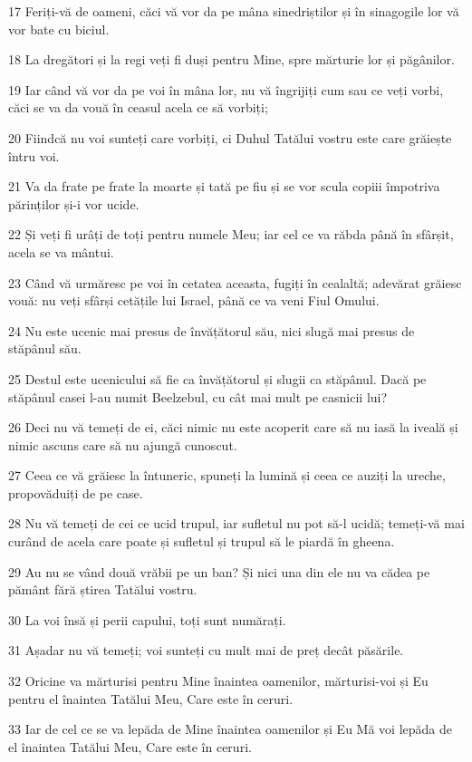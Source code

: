 \par 17 Feriți-vă de oameni, căci vă vor da pe mâna sinedriștilor și în sinagogile lor vă vor bate cu biciul.
\par 18 La dregători și la regi veți fi duși pentru Mine, spre mărturie lor și păgânilor.
\par 19 Iar când vă vor da pe voi în mâna lor, nu vă îngrijiți cum sau ce veți vorbi, căci se va da vouă în ceasul acela ce să vorbiți;
\par 20 Fiindcă nu voi sunteți care vorbiți, ci Duhul Tatălui vostru este care grăiește întru voi.
\par 21 Va da frate pe frate la moarte și tată pe fiu și se vor scula copiii împotriva părinților și-i vor ucide.
\par 22 Și veți fi urâți de toți pentru numele Meu; iar cel ce va răbda până în sfârșit, acela se va mântui.
\par 23 Când vă urmăresc pe voi în cetatea aceasta, fugiți în cealaltă; adevărat grăiesc vouă: nu veți sfârși cetățile lui Israel, până ce va veni Fiul Omului.
\par 24 Nu este ucenic mai presus de învățătorul său, nici slugă mai presus de stăpânul său.
\par 25 Destul este ucenicului să fie ca învățătorul și slugii ca stăpânul. Dacă pe stăpânul casei l-au numit Beelzebul, cu cât mai mult pe casnicii lui?
\par 26 Deci nu vă temeți de ei, căci nimic nu este acoperit care să nu iasă la iveală și nimic ascuns care să nu ajungă cunoscut.
\par 27 Ceea ce vă grăiesc la întuneric, spuneți la lumină și ceea ce auziți la ureche, propovăduiți de pe case.
\par 28 Nu vă temeți de cei ce ucid trupul, iar sufletul nu pot să-l ucidă; temeți-vă mai curând de acela care poate și sufletul și trupul să le piardă în gheena.
\par 29 Au nu se vând două vrăbii pe un ban? Și nici una din ele nu va cădea pe pământ fără știrea Tatălui vostru.
\par 30 La voi însă și perii capului, toți sunt numărați.
\par 31 Așadar nu vă temeți; voi sunteți cu mult mai de preț decât păsările.
\par 32 Oricine va mărturisi pentru Mine înaintea oamenilor, mărturisi-voi și Eu pentru el înaintea Tatălui Meu, Care este în ceruri.
\par 33 Iar de cel ce se va lepăda de Mine înaintea oamenilor și Eu Mă voi lepăda de el înaintea Tatălui Meu, Care este în ceruri.
